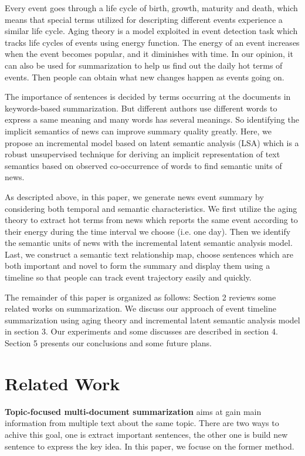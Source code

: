 \documentclass{llncs}
\begin{document}
Every event goes through a life cycle of birth, growth, maturity and death, which means that special terms utilized for descripting different events experience a similar life cycle. Aging theory \cite{2003-Chen-p47-59} is a model exploited in event detection task which tracks life cycles of events using energy function. The energy of an event increases when the event becomes popular, and it diminishes with time. In our opinion, it can also be used for summarization to help us find out the daily hot terms of events. Then people can obtain what new changes happen as events going on.

The importance of sentences is decided by terms occurring at the documents in keywords-based summarization. But different authors use different words to express a same meaning and many words has several meanings. So identifying the implicit semantics of news can improve summary quality greatly. Here, we propose an incremental model based on latent semantic analysis (LSA) \cite{1990-Deerwester-p391-407} which is a robust unsupervised technique for deriving an implicit representation of text semantics based on observed co-occurrence of words to find semantic units of news.

As descripted above, in this paper, we generate news event summary by considering both temporal and semantic characteristics. We first utilize the aging theory \cite{2003-Chen-p47-59} to extract hot terms from news which reports the same event according to their energy during the time interval we choose (i.e. one day). Then we identify the semantic units of news with the incremental latent semantic analysis model. Last, we construct a semantic text relationship map, choose sentences which are both important and novel to form the summary and display them using a timeline so that people can track event trajectory easily and quickly.

The remainder of this paper is organized as follows: Section 2 reviews some related works on summarization. We discuss our approach of event timeline summarization using aging theory and incremental latent semantic analysis model in section 3. Our experiments and some discusses are described in section 4. Section 5 presents our conclusions and some future plans.


%
\section{Related Work}
%
\textbf{Topic-focused multi-document summarization} aims at gain main information from multiple text about the same topic. There are two ways to achive this goal, one is extract important sentences, the other one is build new sentence to express the key idea. In this paper, we focuse on the former method.
\end{document}
